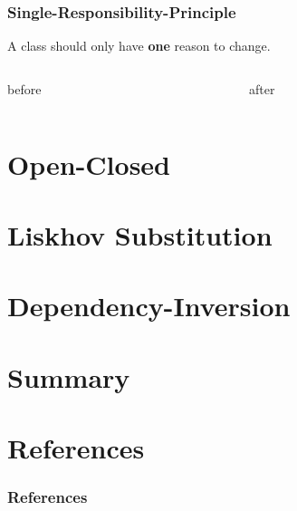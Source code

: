 \documentclass[9pt,dvips]{beamer}
\begin{document}
\begin{frame}
  \frametitle{Single-Responsibility-Principle}
  \begin{theorem}
    A class should only have \textbf{one} reason to change.
  \end{theorem}
\vfill
  \begin{columns}[c]
    \begin{column}{.49\textwidth}
       \begin{block}{before}

       \end{block}
    \end{column}
    \begin{column}{.49\textwidth}
       \begin{block}{after}
      \end{block}
    \end{column}
  \end{columns}
\end{frame}

\section{Open-Closed}

\section{Liskhov Substitution}

\section{Dependency-Inversion}

\section{Summary}

\section{References}
\scriptsize
\begin{frame}
  \frametitle{References}
   
  
\end{frame}
\end{document}
